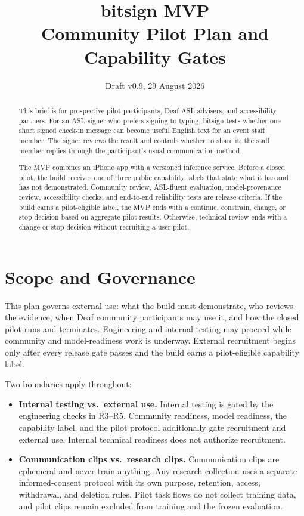 \documentclass[11pt]{article}
\title{\textbf{bitsign MVP} \\ \large Community Pilot Plan and Capability Gates}
\author{}
\date{Draft v0.9, 29 August 2026}
\begin{document}
\maketitle

\begin{abstract}
\noindent This brief is for prospective pilot participants, Deaf ASL advisers, and
accessibility partners. For an ASL signer who prefers signing to typing, bitsign tests
whether one short signed check-in message can become useful English text for an event
staff member. The signer reviews the result and controls whether to share it; the
staff member replies through the participant's usual communication method.

The MVP combines an iPhone app with a versioned inference service. Before a closed
pilot, the build receives one of three public capability labels that state what it has
and has not demonstrated. Community review, ASL-fluent evaluation, model-provenance
review, accessibility checks, and end-to-end reliability tests are release criteria.
If the build earns a pilot-eligible label, the MVP ends with a continue, constrain,
change, or stop decision based on aggregate pilot results. Otherwise, technical review
ends with a change or stop decision without recruiting a user pilot.
\end{abstract}

\setcounter{tocdepth}{1}
\tableofcontents

\section{Scope and Governance}

This plan governs external use: what the build must demonstrate, who reviews the
evidence, when Deaf community participants may use it, and how the closed pilot runs
and terminates. Engineering and internal testing may proceed while community and
model-readiness work is underway. External recruitment begins only after every
release gate passes and the build earns a pilot-eligible capability label.

Two boundaries apply throughout:

\begin{itemize}[nosep]
  \item \textbf{Internal testing vs.\ external use.} Internal testing is gated by
        the engineering checks in R3--R5. Community readiness, model readiness, the
        capability label, and the pilot protocol additionally gate recruitment and
        external use. Internal technical readiness does not authorize recruitment.
  \item \textbf{Communication clips vs.\ research clips.} Communication clips are
        ephemeral and never train anything. Any research collection uses a separate
        informed-consent protocol with its own purpose, retention, access,
        withdrawal, and deletion rules. Pilot task flows do not collect training
        data, and pilot clips remain excluded from training and the frozen
        evaluation.
\end{itemize}
\end{document}

